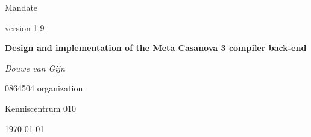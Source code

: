 \documentclass[12pt,a4paper]{report}
\begin{document}
\begin{titlepage}
	\centering
	{\Large Mandate\par}
        {version 1.9\par}
        \vspace{2cm}
	       {\huge\bfseries Design and implementation of the Meta Casanova 3 compiler back-end \par}
	\vfill
	{\Large\itshape Douwe van Gijn\par}
	0864504
	\vfill
	organization\par
	Kenniscentrum 010
	\vfill
	{\large \today\par}
\end{titlepage}
\end{document}
